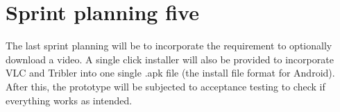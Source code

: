 \section{Sprint planning five}
The last sprint planning will be to incorporate the requirement to optionally download a video. A single click installer will also be provided to incorporate VLC and Tribler into one single .apk file (the install file format for Android). After this, the prototype will be subjected to acceptance testing to check if everything works as intended.